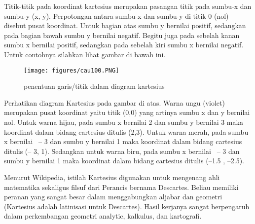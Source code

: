 Titik-titik pada koordinat kartesius merupakan pasangan titik pada sumbu-x dan sumbu-y (x, y). Perpotongan antara sumbu-x dan sumbu-y di titik 0 (nol) disebut pusat koordinat. Untuk bagian atas sumbu y bernilai positif, sedangkan pada bagian bawah sumbu y bernilai negatif. Begitu juga pada sebelah kanan sumbu x bernilai positif, sedangkan pada sebelah kiri sumbu x bernilai negatif. Untuk contohnya silahkan lihat gambar di bawah ini. 
\begin{figure}[ht]
	\centerline{\texttt{[image: figures/cau100.PNG]}}
	\caption{penentuan garis/titik dalam diagram kartesius}
	\label{cau100}
	\end{figure}

Perhatikan diagram Kartesius pada gambar di atas. Warna ungu (violet) merupakan pusat koordinat yaitu titik (0,0) yang artinya sumbu x dan y bernilai nol. Untuk warna hijau, pada sumbu x bernilai 2 dan sumbu y bernilai 3 maka koordinat dalam bidang cartesius ditulis (2,3). Untuk warna merah, pada sumbu x bernilai  – 3 dan sumbu y bernilai 1 maka koordinat dalam bidang cartesius ditulis (– 3, 1). Sedangkan untuk warna biru, pada sumbu x bernilai  – 3 dan sumbu y bernilai 1 maka koordinat dalam bidang cartesius ditulis (–1.5 , –2.5).

Menurut Wikipedia, istilah Kartesius digunakan untuk mengenang ahli matematika sekaligus filsuf dari Perancis bernama Descartes. Beliau memiliki peranan yang sangat besar dalam menggabungkan aljabar dan geometri (Kartesius adalah latinisasi untuk Descartes). Hasil kerjanya sangat berpengaruh dalam perkembangan geometri analytic, kalkulus, dan kartografi.


